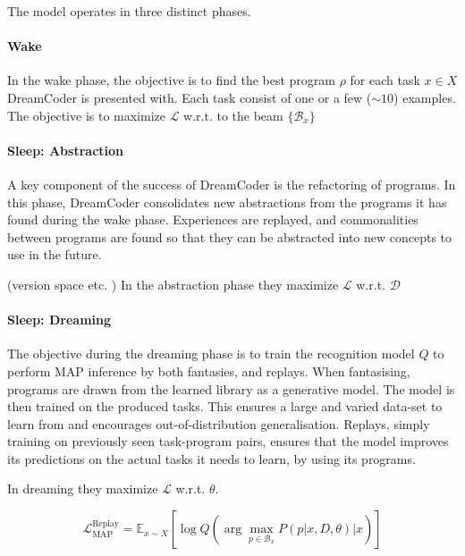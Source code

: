 The model operates in three distinct phases. 

\paragraph{Wake} In the wake phase, the objective is to find the best program $\rho$ for each task $x \in X$ DreamCoder is presented with. Each task consist of one or a few ($\sim10$) examples.
The objective is to maximize \(\mathcal{L}\) w.r.t. to the beam \(\{\mathcal{B}_x\}\)

\paragraph{Sleep: Abstraction} A key component of the success of DreamCoder is the refactoring of programs. In this phase, DreamCoder consolidates new abstractions from the programs it has found during the wake phase. Experiences are replayed, and commonalities between programs are found so that they can be abstracted into new concepts to use in the future. 

(version space etc. )
In the abstraction phase they maximize \(\mathcal{L}\) w.r.t. \(\mathcal{D}\)


\paragraph{Sleep: Dreaming} The objective during the dreaming phase is to train the recognition model $Q$ to perform MAP inference by both fantasies, and replays. When fantasising, programs are drawn from the learned library as a generative model. The model is then trained on the produced tasks. This ensures a large and varied data-set to learn from and encourages out-of-distribution generalisation. Replays, simply training on previously seen task-program pairs, ensures that the model improves its predictions on the actual tasks it needs to learn, by using its programs.

In dreaming they maximize \(\mathcal{L}\) w.r.t. \(\theta\).


\[
    \mathcal{L}_{\text{MAP}}^{\text{Replay}} = \mathbb{E}_{x\sim X} \left[ \log Q \left( \arg\max_{p \in \mathcal{B}_x} P(p|x, D, \theta)  \Big\lvert x \right) \right]
\]

